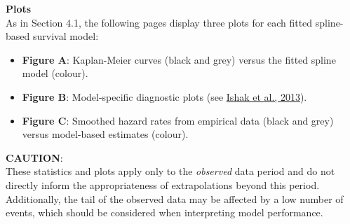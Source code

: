 \documentclass[
]{article}
\providecommand{\tightlist}{%
  \setlength{\itemsep}{0pt}\setlength{\parskip}{0pt}}
\begin{document}
\textbf{Plots}\\
As in Section 4.1, the following pages display three plots for each
fitted spline-based survival model:

\begin{itemize}
\tightlist
\item
  \textbf{Figure A}: Kaplan-Meier curves (black and grey) versus the
  fitted spline model (colour).\\
\item
  \textbf{Figure B}: Model-specific diagnostic plots (see
  \href{https://doi.org/10.1007/s40273-013-0064-3}{Ishak et al.,
  2013}).\\
\item
  \textbf{Figure C}: Smoothed hazard rates from empirical data (black
  and grey) versus model-based estimates (colour).
\end{itemize}

\textbf{CAUTION}:\\
These statistics and plots apply only to the \emph{observed} data period
and do not directly inform the appropriateness of extrapolations beyond
this period.\\
Additionally, the tail of the observed data may be affected by a low
number of events, which should be considered when interpreting model
performance.

\clearpage
\end{document}
